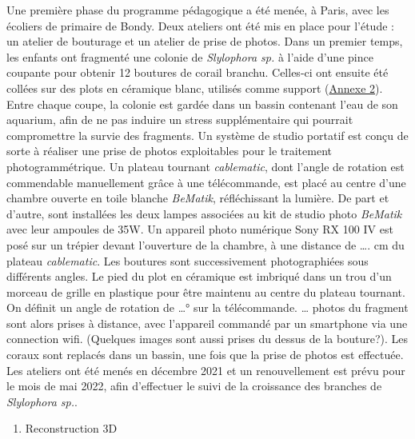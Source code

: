 \documentclass[]{article}
\providecommand{\tightlist}{%
  \setlength{\itemsep}{0pt}\setlength{\parskip}{0pt}}
\begin{document}
Une première phase du programme pédagogique a été menée, à Paris, avec
les écoliers de primaire de Bondy. Deux ateliers ont été mis en place
pour l'étude : un atelier de bouturage et un atelier de prise de photos.
Dans un premier temps, les enfants ont fragmenté une colonie de
\emph{Slylophora sp.} à l'aide d'une pince coupante pour obtenir 12
boutures de corail branchu. Celles-ci ont ensuite été collées sur des
plots en céramique blanc, utilisés comme support
(\protect\hyperlink{Annexeux5cux25202}{Annexe 2}). Entre chaque coupe,
la colonie est gardée dans un bassin contenant l'eau de son aquarium,
afin de ne pas induire un stress supplémentaire qui pourrait
compromettre la survie des fragments. Un système de studio portatif est
conçu de sorte à réaliser une prise de photos exploitables pour le
traitement photogrammétrique. Un plateau tournant \emph{cablematic},
dont l'angle de rotation est commendable manuellement grâce à une
télécommande, est placé au centre d'une chambre ouverte en toile blanche
\emph{BeMatik}, réfléchissant la lumière. De part et d'autre, sont
installées les deux lampes associées au kit de studio photo
\emph{BeMatik} avec leur ampoules de 35W. Un appareil photo numérique
Sony RX 100 IV est posé sur un trépier devant l'ouverture de la chambre,
à une distance de \ldots{}. cm du plateau \emph{cablematic}. Les
boutures sont successivement photographiées sous différents angles. Le
pied du plot en céramique est imbriqué dans un trou d'un morceau de
grille en plastique pour être maintenu au centre du plateau tournant. On
définit un angle de rotation de \ldots{}° sur la télécommande. \ldots{}
photos du fragment sont alors prises à distance, avec l'appareil
commandé par un smartphone via une connection wifi. (Quelques images
sont aussi prises du dessus de la bouture?). Les coraux sont replacés
dans un bassin, une fois que la prise de photos est effectuée. Les
ateliers ont été menés en décembre 2021 et un renouvellement est prévu
pour le mois de mai 2022, afin d'effectuer le suivi de la croissance des
branches de \emph{Slylophora sp.}.

\begin{enumerate}
\def\labelenumi{\arabic{enumi})}
\setcounter{enumi}{1}
\tightlist
\item
  Reconstruction 3D
\end{enumerate}
\end{document}
